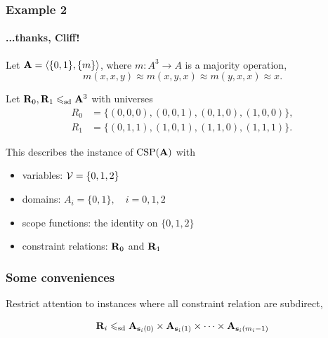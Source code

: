 \documentclass[xcolor=dvipsnames,9pt,hide notes,mathserif]{beamer}
\renewcommand{\alert}[1]{\textcolor{olivegreen}{#1}}
\begin{document}
\begin{frame}
  \frametitle{Example 2}
  \framesubtitle{...thanks, Cliff!}
  
  Let $\mathbf{A} = \langle\{0,1\}, \{m\}\rangle$, where $m: A^3 \to A$ is a majority operation, 
  \[m(x,x,y)\approx m(x,y,x)\approx m(y,x,x) \approx x.\]
  
  Let $\mathbf{R}_0, \mathbf{R}_1 \leqslant_{\mathrm{sd}} \mathbf{A}^3$ with universes
  \begin{align*}
    R_0 &= \{(0,0,0), (0,0,1), (0,1,0), (1,0,0)\},\\
    R_1 &= \{(0,1,1), (1,0,1), (1,1,0), (1,1,1)\}.
  \end{align*}

  This describes the instance of $\operatorname{CSP}(\mathbf{A})$ with
  \begin{itemize}
  \item \alert{variables:} $\mathcal{V} = \{0,1,2\}$
  \item \alert{domains:} $A_i =\{0,1\}, \quad i = 0,1,2$
  \item \alert{scope functions:} the identity on $\{0,1,2\}$
  \item \alert{constraint relations:} $\mathbf{R}_0$ and $\mathbf{R}_1$
  \end{itemize}
\end{frame}
\begin{frame}
  \frametitle{Some conveniences}

  Restrict attention to instances where all constraint relation are
  subdirect,
  
  \[\mathbf{R}_i \leqslant_{\mathrm{sd}} \mathbf{A}_{\mathbf{s}_i(0)} \times \mathbf{A}_{\mathbf{s}_i(1)}\times \cdots \times \mathbf{A}_{\mathbf{s}_i(m_i-1)}\]

  \bigskip

  \bigskip


  \medskip

\end{frame}
\end{document}
